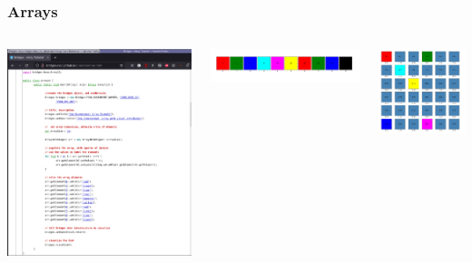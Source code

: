\documentclass[aspectratio=169]{beamer}
\begin{document}
\begin{frame}
  \frametitle{Arrays}

  \begin{columns}
    \includegraphics[width=1.0\linewidth]{viz_figs/ArrayCode.png}
    

    \includegraphics[width=1.0\linewidth]{viz_figs/Array1Dout.png}

    \includegraphics[width=.5\linewidth]{viz_figs/Array2Dout.png}


\end{columns}
\end{frame}
\end{document}
